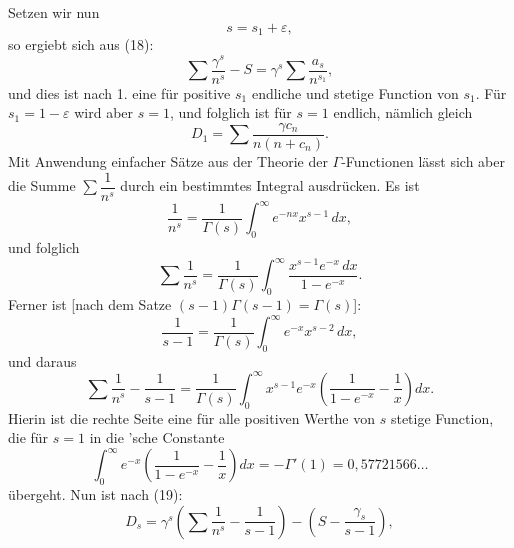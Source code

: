 Setzen wir nun
\[
s = s_1 + \varepsilon,
\]
so ergiebt sich aus (18):
\[
\sum \frac{\gamma^s}{n^s} - S = \gamma^s \sum \frac{a_s}{n^{s_1}},
\]
und dies ist nach 1. eine für positive $s_1$ endliche und stetige Function von $s_1$. Für $s_1 = 1-\varepsilon$ wird aber $s=1$, und folglich ist
für $s=1$ endlich, nämlich gleich
\[
D_1 = \sum \frac{\gamma c_n}{n(n+c_n)}.
\]
Mit Anwendung einfacher Sätze aus der Theorie der $\Gamma$-Functionen lässt sich aber die Summe $\sum \dfrac{1}{n^s}$ durch ein bestimmtes Integral ausdrücken. Es ist
\[
\frac{1}{n^s} = \frac{1}{\Gamma(s)}\int_0^{\infty} e^{-nx} x^{s-1}\, dx,
\]
und folglich
\[
\sum \frac{1}{n^s} = \frac{1}{\Gamma(s)}\int_0^{\infty} \frac{x^{s-1}e^{-x}\,dx}{1-e^{-x}}.
\]
Ferner ist [nach dem Satze $(s-1)\Gamma(s-1) = \Gamma(s)$]:
\[
\frac{1}{s-1} = \frac{1}{\Gamma(s)}\int_0^{\infty} e^{-x} x^{s-2}\, dx,
\]
und daraus
\[
\sum \frac{1}{n^s} - \frac{1}{s-1} = \frac{1}{\Gamma(s)}\int_0^{\infty} x^{s-1}e^{-x}\left(\frac{1}{1-e^{-x}} - \frac{1}{x}\right)dx.
\]
Hierin ist die rechte Seite eine für alle positiven Werthe von $s$ stetige Function, die für $s=1$ in die 'sche Constante
\[
\int_0^{\infty} e^{-x}\left(\frac{1}{1-e^{-x}} - \frac{1}{x}\right)dx = -\Gamma'(1) = 0{,}57721566\ldots
\]
übergeht. Nun ist nach (19):
\[
D_s = \gamma^s\left(\sum \frac{1}{n^s} - \frac{1}{s-1}\right) - \left(S - \frac{\gamma_s}{s-1}\right),
\]
